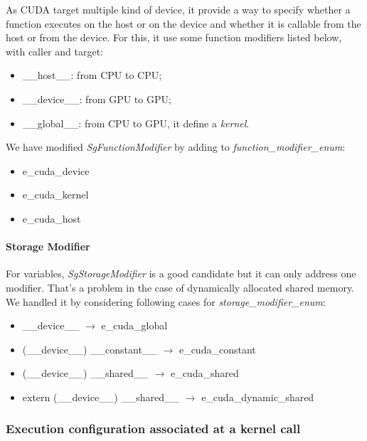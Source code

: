 As CUDA target multiple kind of device, it provide a way to specify whether a function executes on the host or on the device and whether it is
callable from the host or from the device. For this, it use some function modifiers listed below, with caller and target:
\begin{itemize}
	\item \_\_host\_\_: from CPU to CPU;
	\item \_\_device\_\_: from GPU to GPU;
	\item \_\_global\_\_: from CPU to GPU, it define a \emph{kernel}.
\end{itemize}
We have modified \emph{SgFunctionModifier} by adding to \emph{function\_modifier\_enum}:
\begin{itemize}
	\item e\_cuda\_device
	\item e\_cuda\_kernel
	\item e\_cuda\_host
\end{itemize}

				\paragraph{Storage Modifier}	

For variables, \emph{SgStorageModifier} is a good candidate but it can only address one modifier. That's a problem in the case of dynamically allocated shared memory.
We handled it by considering following cases for \emph{storage\_modifier\_enum}:
		
\begin{itemize}
	\item \_\_device\_\_ $\rightarrow$ e\_cuda\_global
	\item (\_\_device\_\_) \_\_constant\_\_ $\rightarrow$ e\_cuda\_constant
	\item (\_\_device\_\_) \_\_shared\_\_ $\rightarrow$ e\_cuda\_shared
	\item extern (\_\_device\_\_) \_\_shared\_\_ $\rightarrow$ e\_cuda\_dynamic\_shared
\end{itemize}

			\subsubsection{Execution configuration associated at a kernel call}

